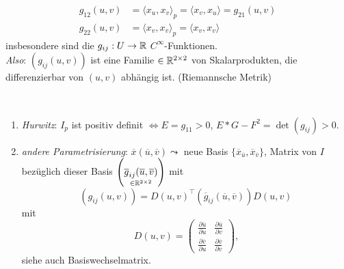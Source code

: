 \begin{remark}
\begin{align*}
    g_{12}(u,v) &= \langle x_u, x_v \rangle_p = \langle x_v, x_u \rangle = g_{21}(u,v) \\
    g_{22}(u,v) &= \langle x_v, x_v \rangle_p = \langle x_v, x_v \rangle
  \end{align*}
  insbesondere sind die $ g_{ij}: U \to \mathbb{R} $ $ C^\infty $-Funktionen. \\
  \emph{Also}: $ \left( g_{ij}(u,v) \right) $ ist eine Familie $ \in \mathbb{R}^{2\times 2} $ von Skalarprodukten, die differenzierbar von $ (u,v) $ abhängig ist. (Riemannsche Metrik)
\end{remark}

\begin{remark}
  \
  \begin{enumerate}
    \item \emph{Hurwitz}: $ I_p $ ist positiv definit $ \Leftrightarrow E = g_{11} > 0 $, $ E*G-F^2 = \det(g_{ij}) > 0 $.
    \item \emph{andere Parametrisierung}: $ \overline{x}(\overline{u},\overline{v}) \leadsto $ neue Basis $ \{ \overline{x}_{\overline{u}}, \overline{x}_{\overline{v}} \} $, Matrix von $ I $ bezüglich dieser Basis $ \left( \underset{\in \mathbb{R}^{2\times 2}}{\overline{g}_{ij}(\overline{u}, \overline{v})} \right) $ mit
    \begin{equation*}
      \left( g_{ij}(u,v) \right) = D(u,v)^\top(\overline{g}_{ij}(\overline{u},\overline{v}))D(u,v)
    \end{equation*}
    mit 
    \begin{equation*}
      D(u,v) = \begin{pmatrix}
        \frac{\partial \overline{u}}{\partial u} & \frac{\partial \overline{u}}{\partial v} \\
        \frac{\partial \overline{v}}{\partial u} & \frac{\partial \overline{v}}{\partial v}
      \end{pmatrix}\text{,}
    \end{equation*}
    siehe auch Basiswechselmatrix.
  \end{enumerate}
\end{remark}


